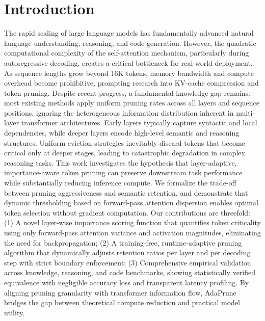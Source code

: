 \documentclass[11pt,a4paper]{article}
\begin{document}
\section{Introduction}
The rapid scaling of large language models has fundamentally advanced natural language understanding, reasoning, and code generation. However, the quadratic computational complexity of the self-attention mechanism, particularly during autoregressive decoding, creates a critical bottleneck for real-world deployment. As sequence lengths grow beyond 16K tokens, memory bandwidth and compute overhead become prohibitive, prompting research into KV-cache compression and token pruning. Despite recent progress, a fundamental knowledge gap remains: most existing methods apply uniform pruning rates across all layers and sequence positions, ignoring the heterogeneous information distribution inherent in multi-layer transformer architectures. Early layers typically capture syntactic and local dependencies, while deeper layers encode high-level semantic and reasoning structures. Uniform eviction strategies inevitably discard tokens that become critical only at deeper stages, leading to catastrophic degradation in complex reasoning tasks. This work investigates the hypothesis that layer-adaptive, importance-aware token pruning can preserve downstream task performance while substantially reducing inference compute. We formalize the trade-off between pruning aggressiveness and semantic retention, and demonstrate that dynamic thresholding based on forward-pass attention dispersion enables optimal token selection without gradient computation. Our contributions are threefold: (1) A novel layer-wise importance scoring function that quantifies token criticality using only forward-pass attention variance and activation magnitudes, eliminating the need for backpropagation; (2) A training-free, runtime-adaptive pruning algorithm that dynamically adjusts retention ratios per layer and per decoding step with strict boundary enforcement; (3) Comprehensive empirical validation across knowledge, reasoning, and code benchmarks, showing statistically verified equivalence with negligible accuracy loss and transparent latency profiling. By aligning pruning granularity with transformer information flow, AdaPrune bridges the gap between theoretical compute reduction and practical model utility.
\end{document}
